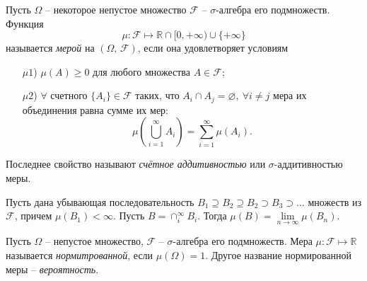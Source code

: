 \begin{to_def}
    Пусть $\Omega$ -- некоторое непустое множество $\mathcal F$ -- $\sigma$-алгебра его подмножеств. Функция
    \begin{equation*}
        \mu \colon  \mathcal F \mapsto \mathbb{R} \cap [0, +\infty) \cup \{+\infty\}
    \end{equation*}
    называется \textit{мерой} на $(\Omega, \, \mathcal F)$, если она удовлетворяет условиям
    \begin{itemize}
        \item[$\mu 1$)] $\mu(A) \geq 0$ для любого множества $A \in \mathcal F$;
        \item[$\mu 2$)] $\forall$ счетного $\{A_i\} \in \mathcal F$ таких, что $A_i \cap A_j = \varnothing, \ \forall i \neq j$ мера их объединения равна сумме их мер:
        \begin{equation*}
            \mu\left(
                \bigcup_{i=1}^{\infty} A_i
            \right) = \sum_{i=1}^{\infty} \mu (A_i).
        \end{equation*}
    \end{itemize}
\end{to_def}

Последнее свойство называют \textit{счётное аддитивностью} или $\sigma$-аддитивностью меры. 


\begin{to_thr}
    Пусть дана убывающая последовательность $B_1 \supseteq B_2 \supseteq B_2 \supset B_3 \supset \ldots$ множеств из $\mathcal F$, причем $\mu(B_1) < \infty$. Пусть $B = \cap_i^{\infty} B_i$. Тогда $\mu(B) = \lim\limits_{n\to\infty} \mu (B_n)$.
\end{to_thr}

\begin{to_def}
    Пусть $\Omega$ -- непустое множество, $\mathcal F$ -- $\sigma$-алгебра его подмножеств. Мера $\mu \colon  \mathcal F \mapsto \mathbb{R}$ называется \textit{нормитрованной}, если $\mu(\Omega)=1$. Другое название нормированной меры -- \textit{вероятность}. 
\end{to_def}

